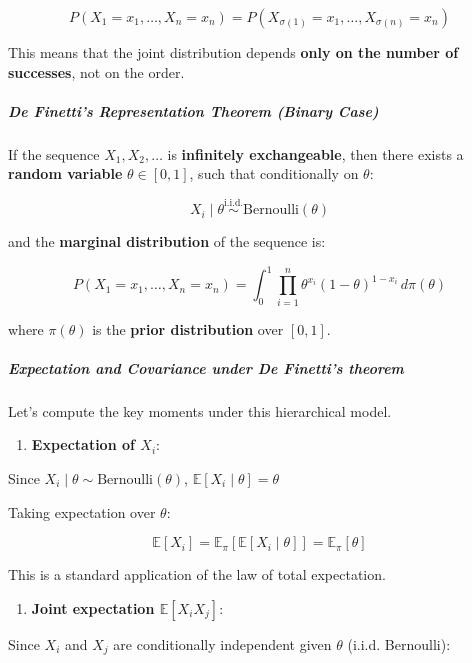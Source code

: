 \documentclass[
]{article}
\providecommand{\tightlist}{%
  \setlength{\itemsep}{0pt}\setlength{\parskip}{0pt}}
\begin{document}
\[
P(X_1 = x_1, \dots, X_n = x_n) = P(X_{\sigma(1)} = x_1, \dots, X_{\sigma(n)} = x_n)
\]

This means that the joint distribution depends \textbf{only on the
number of successes}, not on the order.

\subparagraph{De Finetti's Representation Theorem (Binary
Case)}\label{de-finettis-representation-theorem-binary-case}

If the sequence \(X_1, X_2, \dots\) is \textbf{infinitely exchangeable},
then there exists a \textbf{random variable} \(\theta \in [0,1]\), such
that conditionally on \(\theta\):

\[
X_i \mid \theta \overset{\text{i.i.d.}}{\sim} \text{Bernoulli}(\theta)
\]

and the \textbf{marginal distribution} of the sequence is:

\[
P(X_1 = x_1, \dots, X_n = x_n) = \int_0^1 \prod_{i=1}^n \theta^{x_i} (1 - \theta)^{1 - x_i} \, d\pi(\theta)
\]

where \(\pi(\theta)\) is the \textbf{prior distribution} over \([0,1]\).

\subparagraph{Expectation and Covariance under De Finetti's
theorem}\label{expectation-and-covariance-under-de-finettis-theorem}

Let's compute the key moments under this hierarchical model.

\begin{enumerate}
\def\labelenumi{\arabic{enumi}.}
\tightlist
\item
  \textbf{Expectation of \(X_i\)}:
\end{enumerate}

Since \(X_i \mid \theta \sim \text{Bernoulli}(\theta)\),
\(\mathbb{E}[X_i \mid \theta] = \theta\)

Taking expectation over \(\theta\):

\[
\mathbb{E}[X_i] = \mathbb{E}_\pi\left[ \mathbb{E}[X_i \mid \theta] \right] = \mathbb{E}_\pi[\theta]
\]

This is a standard application of the law of total expectation.

\begin{enumerate}
\def\labelenumi{\arabic{enumi}.}
\setcounter{enumi}{1}
\tightlist
\item
  \textbf{Joint expectation \(\mathbb{E}[X_i X_j]\)}:
\end{enumerate}

Since \(X_i\) and \(X_j\) are conditionally independent given \(\theta\)
(i.i.d. Bernoulli):
\end{document}
